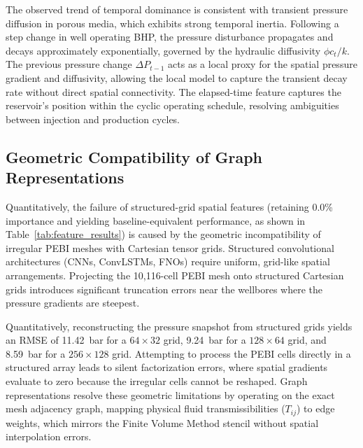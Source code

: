 The observed trend of temporal dominance is consistent with transient pressure diffusion in porous media, which exhibits strong temporal inertia. Following a step change in well operating BHP, the pressure disturbance propagates and decays approximately exponentially, governed by the hydraulic diffusivity $\phi c_t / k$. The previous pressure change $\Delta P_{t-1}$ acts as a local proxy for the spatial pressure gradient and diffusivity, allowing the local model to capture the transient decay rate without direct spatial connectivity. The elapsed-time feature captures the reservoir's position within the cyclic operating schedule, resolving ambiguities between injection and production cycles.

\subsection{Geometric Compatibility of Graph Representations}
Quantitatively, the failure of structured-grid spatial features (retaining 0.0\% importance and yielding baseline-equivalent performance, as shown in Table~\ref{tab:feature_results}) is caused by the geometric incompatibility of irregular PEBI meshes with Cartesian tensor grids. Structured convolutional architectures (CNNs, ConvLSTMs, FNOs) require uniform, grid-like spatial arrangements. Projecting the 10,116-cell PEBI mesh onto structured Cartesian grids introduces significant truncation errors near the wellbores where the pressure gradients are steepest. 

Quantitatively, reconstructing the pressure snapshot from structured grids yields an RMSE of 11.42~bar for a $64 \times 32$ grid, 9.24~bar for a $128 \times 64$ grid, and 8.59~bar for a $256 \times 128$ grid. Attempting to process the PEBI cells directly in a structured array leads to silent factorization errors, where spatial gradients evaluate to zero because the irregular cells cannot be reshaped. Graph representations resolve these geometric limitations by operating on the exact mesh adjacency graph, mapping physical fluid transmissibilities ($T_{ij}$) to edge weights, which mirrors the Finite Volume Method stencil without spatial interpolation errors.

